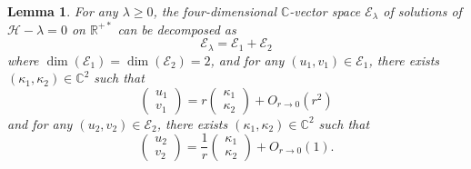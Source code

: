 \documentclass[11 pt]{amsart}
\newtheorem{lem}{Lemma}[section]
\theoremstyle{definition}
\theoremstyle{remark}
\numberwithin{equation}{section}
\begin{document}
\begin{lem}
  \label{zerosol}For any $\lambda \geqslant 0$, the four-dimensional
  $\mathbb{C}$-vector space $\mathcal{E}_{\lambda}$ of solutions of
  $\mathcal{H}- \lambda = 0$ on $\mathbb{R}^{+ \ast}$ can be decomposed as
  \[ \mathcal{E}_{\lambda} =\mathcal{E}_1 +\mathcal{E}_2 \]
  where $\dim (\mathcal{E}_1) = \dim (\mathcal{E}_2) = 2$, and for any $(u_1,
  v_1) \in \mathcal{E}_1$, there exists $(\kappa_1, \kappa_2) \in
  \mathbb{C}^2$ such that
  \[ \left(\begin{array}{c}
       u_1\\
       v_1
     \end{array}\right) = r \left(\begin{array}{c}
       \kappa_1\\
       \kappa_2
     \end{array}\right) + O_{r \rightarrow 0} (r^2) \]
  and for any $(u_2, v_2) \in \mathcal{E}_2$, there exists $(\kappa_1,
  \kappa_2) \in \mathbb{C}^2$ such that
  \[ \left(\begin{array}{c}
       u_2\\
       v_2
     \end{array}\right) = \frac{1}{r} \left(\begin{array}{c}
       \kappa_1\\
       \kappa_2
     \end{array}\right) + O_{r \rightarrow 0} (1) . \]
\end{lem}
\end{document}
